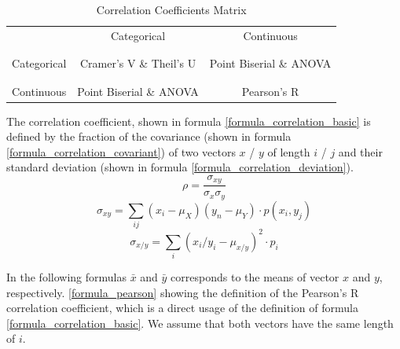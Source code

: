 \documentclass[a4paper,12pt]{report}
\begin{document}
\bigskip

\begin{table}[ht]
	\centering
	\begin{tabular}{c|c|c}
					& Categorical 				& Continuous \\
		\\[-1em]
		\hline
		\\[-1em]
		Categorical & Cramer’s V \& Theil’s U 	& Point Biserial \& ANOVA \\
		\\[-1em]
		\hline
		\\[-1em]
		Continuous 	& Point Biserial \& ANOVA 	& Pearson's R \\
	\end{tabular}
	\caption{\label{tab:table-name}Correlation Coefficients Matrix}
\end{table}

\bigskip

\par The correlation coefficient, shown in formula \ref{formula_correlation_basic} is defined by the fraction of the covariance (shown in formula \ref{formula_correlation_covariant}) of two vectors $x$ / $y$ of length $i$ / $j$ and their standard deviation (shown in formula \ref{formula_correlation_deviation}). \cite{HerzSchlicherSiegener1992} 
\smallskip
\begin{equation}
\label{formula_correlation_basic}
	\rho = \frac{\sigma_{xy}}{\sigma_{x}\sigma_{y}}
\end{equation}
\begin{equation}
\label{formula_correlation_covariant}
	\sigma_{xy} = \sum_{ij}(x_i-\mu_X)(y_n-\mu_Y) \cdot p(x_i,y_j)
\end{equation}
\begin{equation}
\label{formula_correlation_deviation}
	\sigma_{x/y} = \sum_{i}(x_i/y_i-\mu_{x/y})^2 \cdot p_i
\end{equation}

\bigskip

\par In the following formulas $\bar{x}$ and $\bar{y}$ corresponds to the means of vector $x$ and $y$, respectively. \ref{formula_pearson} showing the definition of the Pearson's R correlation coefficient, which is a direct usage of the definition of formula \ref{formula_correlation_basic}. We assume that both vectors have the same length of $i$. 
	\cite{BenestyChenHuang2009}
	
\end{document}
